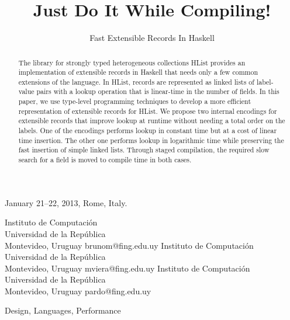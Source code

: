 \documentclass[natbib]{sigplanconf}
\begin{document}
 {January 21--22, 2013, Rome, Italy.}


\title{Just Do It While Compiling!}
\subtitle{Fast Extensible Records In Haskell}


           {Instituto de Computaci\'{o}n \\ Universidad de la  Rep\'{u}blica\\ Montevideo, Uruguay}
           {brunom@fing.edu.uy}
           {Instituto de Computaci\'{o}n \\ Universidad de la  Rep\'{u}blica\\ Montevideo, Uruguay}
           {mviera@fing.edu.uy}
           {Instituto de Computaci\'{o}n \\ Universidad de la  Rep\'{u}blica\\ Montevideo, Uruguay}
           {pardo@fing.edu.uy}
\maketitle

\begin{abstract}
The library for strongly typed heterogeneous collections HList
provides an implementation of extensible records in Haskell that needs
only a few common extensions of the language. In HList, records are
represented as linked lists of label-value pairs with a lookup
operation that is linear-time in the number of fields. In this paper,
we use type-level programming techniques to develop a more efficient
representation of extensible records for HList. We propose two
internal encodings for extensible records that improve lookup at
runtime without needing a total order on the labels. One of the
encodings performs lookup in constant time but at a cost of linear
time insertion. The other one performs lookup in logarithmic time
while preserving the fast insertion of simple linked lists. Through
staged compilation, the required slow search for a field is moved to
compile time in both cases.
\end{abstract}

\terms Design, Languages, Performance
\end{document}
